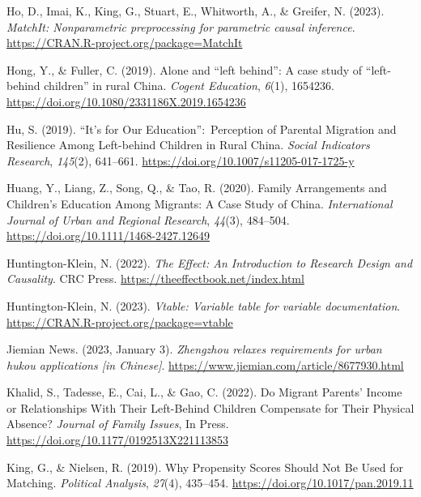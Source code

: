 \documentclass[
  man,floatsintext]{apa7}
\newlength{\cslhangindent}
\newlength{\cslentryspacingunit} %
\newenvironment{CSLReferences}[2] %
 {%
  \setlength{\parindent}{0pt}
  \ifodd #1
  \let\oldpar\par
  \def\par{\hangindent=\cslhangindent\oldpar}
  \fi
  \setlength{\parskip}{#2\cslentryspacingunit}
 }%
 {}
\begin{document}
\begin{CSLReferences}{1}{0}
\leavevmode{}%
Ho, D., Imai, K., King, G., Stuart, E., Whitworth, A., \& Greifer, N. (2023). \emph{MatchIt: Nonparametric preprocessing for parametric causal inference}. \url{https://CRAN.R-project.org/package=MatchIt}

\leavevmode{}%
Hong, Y., \& Fuller, C. (2019). Alone and {``}left behind{''}: A case study of {``}left-behind children{''} in rural {China}. \emph{Cogent Education}, \emph{6}(1), 1654236. \url{https://doi.org/10.1080/2331186X.2019.1654236}

\leavevmode{}%
Hu, S. (2019). {``}It{'}s for Our Education{''}:~Perception of Parental Migration and Resilience Among Left-behind Children in Rural {China}. \emph{Social Indicators Research}, \emph{145}(2), 641--661. \url{https://doi.org/10.1007/s11205-017-1725-y}

\leavevmode{}%
Huang, Y., Liang, Z., Song, Q., \& Tao, R. (2020). Family Arrangements and Children's Education Among Migrants: A Case Study of {China}. \emph{International Journal of Urban and Regional Research}, \emph{44}(3), 484--504. \url{https://doi.org/10.1111/1468-2427.12649}

\leavevmode{}%
Huntington-Klein, N. (2022). \emph{The Effect: An Introduction to Research Design and Causality}. CRC Press. \url{https://theeffectbook.net/index.html}

\leavevmode{}%
Huntington-Klein, N. (2023). \emph{Vtable: Variable table for variable documentation}. \url{https://CRAN.R-project.org/package=vtable}

\leavevmode{}%
Jiemian News. (2023, January 3). \emph{Zhengzhou relaxes requirements for urban hukou applications {[}in {Chinese}{]}}. \url{https://www.jiemian.com/article/8677930.html}

\leavevmode{}%
Khalid, S., Tadesse, E., Cai, L., \& Gao, C. (2022). Do Migrant Parents{'} Income or Relationships With Their Left-Behind Children Compensate for Their Physical Absence? \emph{Journal of Family Issues}, In Press. \url{https://doi.org/10.1177/0192513X221113853}

\leavevmode{}%
King, G., \& Nielsen, R. (2019). Why Propensity Scores Should Not Be Used for Matching. \emph{Political Analysis}, \emph{27}(4), 435--454. \url{https://doi.org/10.1017/pan.2019.11}


\end{CSLReferences}
\end{document}
